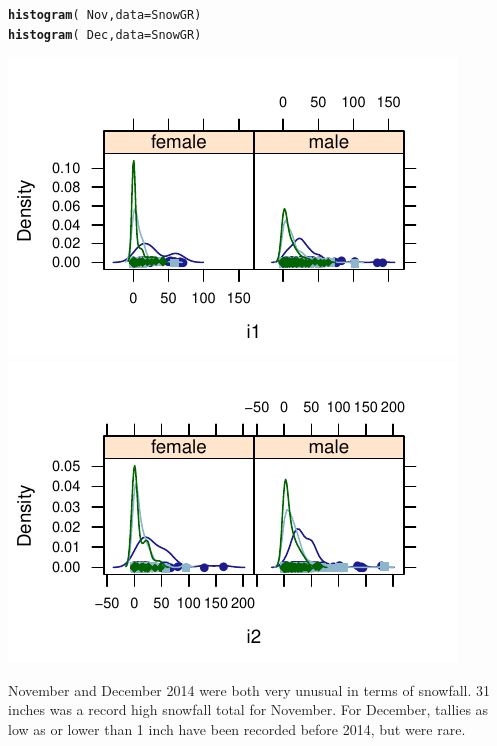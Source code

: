 \documentclass[twoside]{book}\usepackage[]{graphicx}\usepackage[]{xcolor}
\makeatletter
\def\maxwidth{ %
  \ifdim\Gin@nat@width>\linewidth
    \linewidth
  \else
    \Gin@nat@width
  \fi
}
\newcommand{\hlopt}[1]{\textcolor[rgb]{0,0,0}{#1}}%
\newcommand{\hlstd}[1]{\textcolor[rgb]{0.345,0.345,0.345}{#1}}%
\newcommand{\hlkwc}[1]{\textcolor[rgb]{0.333,0.667,0.333}{#1}}%
\newcommand{\hlkwd}[1]{\textcolor[rgb]{0.737,0.353,0.396}{\textbf{#1}}}%
\newenvironment{kframe}{%
 \def\at@end@of@kframe{}%
 \ifinner\ifhmode%
  \def\at@end@of@kframe{\end{minipage}}%
  \begin{minipage}{\columnwidth}%
 \fi\fi%
 \def\FrameCommand##1{\hskip\@totalleftmargin \hskip-\fboxsep
 \colorbox{shadecolor}{##1}\hskip-\fboxsep
     \hskip-\linewidth \hskip-\@totalleftmargin \hskip\columnwidth}%
 \MakeFramed {\advance\hsize-\width
   \@totalleftmargin\z@ \linewidth\hsize
   \@setminipage}}%
 {\par\unskip\endMakeFramed%
 \at@end@of@kframe}
\newenvironment{knitrout}{}{} %
\makeatother
\begin{document}
\begin{solution}
\begin{knitrout}
\color{fgcolor}\begin{kframe}
\begin{alltt}
\hlkwd{histogram}\hlstd{(}\hlopt{~}\hlstd{Nov,} \hlkwc{data}\hlstd{=SnowGR)}
\hlkwd{histogram}\hlstd{(}\hlopt{~}\hlstd{Dec,} \hlkwc{data}\hlstd{=SnowGR)}
\end{alltt}
\end{kframe}

{\centering \includegraphics[width=\maxwidth]{figures/fig-unnamed-chunk-37-1} 
\includegraphics[width=\maxwidth]{figures/fig-unnamed-chunk-37-2} 

}



\end{knitrout}
November and December 2014 were both very unusual in terms of snowfall. 31 inches was a record high snowfall
total for November.  For December, tallies as low as or lower than 1 inch have been recorded before 2014, 
but were rare.


\end{solution}
\end{document}
